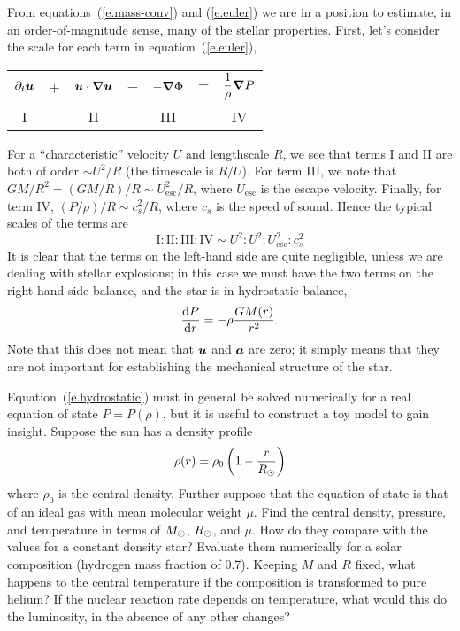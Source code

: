 From equations~(\ref{e.mass-conv}) and (\ref{e.euler}) we are in a position to estimate, in an order-of-magnitude sense, many of the stellar properties.  First, let's consider the scale for each term in equation~(\ref{e.euler}),
\begin{center}\begin{tabular}{ccccccc}
$\displaystyle \partial_{t}\boldsymbol{u}$ & + &
$\displaystyle  \boldsymbol{u}\cdot\boldsymbol{\nabla}\boldsymbol{u}$ & = &
$\displaystyle -\boldsymbol{\nabla} \Phi $ & $-$ & 
$\displaystyle \frac{1}{\rho}\boldsymbol{\nabla} P$\\
I & & II & & III & & IV
\end{tabular}
\end{center}
For a ``characteristic'' velocity $U$ and lengthscale $R$, we see that terms I and II are both of order $\sim U^{2}/R$ (the timescale is $R/U$).  For term III, we note that $GM/R^{2} = (GM/R)/R \sim U_{\mathrm{esc}}^{2}/R$, where $U_{\mathrm{esc}}$ is the escape velocity.  Finally, for term IV, $(P/\rho)/R \sim c_{s}^{2}/R$, where $c_{s}$ is the speed of sound.  Hence the typical scales of the terms are
\[
\textrm{I} : \textrm{II} : \textrm{III} : \textrm{IV} \sim U^{2} : U^{2} : U_{\mathrm{esc}}^{2} : c_{s}^{2}
\]
It is clear that the terms on the left-hand side are quite negligible, unless we are dealing with stellar explosions; in this case we must have the two terms on the right-hand side balance, and the star is in hydrostatic balance, 
\begin{equation}\label{e.hydrostatic}
\frac{\mathrm{d} P}{\mathrm{d} r} = -\rho \frac{GM(r)}{r^{2}}.
\end{equation}
Note that this does not mean that $\boldsymbol{u}$ and $\boldsymbol{a}$ are zero; it simply means that they are not important for establishing the mechanical structure of the star.

\begin{exercisebox}
Equation~(\ref{e.hydrostatic}) must in general be solved numerically for a real equation of state $P = P(\rho)$, but it is useful to construct a toy model to gain insight.  Suppose the sun has a density profile
\[ \rho(r) = \rho_{0}\left(1-\frac{r}{R_{\odot}}\right) \]
where $\rho_{0}$ is the central density. Further suppose that the equation of state is that of an ideal gas with mean molecular weight $\mu$.  Find the central density, pressure, and temperature in terms of $M_\odot$, $R_{\odot}$, and $\mu$. How do they compare with the values for a constant density star?  Evaluate them numerically for a solar composition (hydrogen mass fraction of 0.7).  Keeping $M$ and $R$ fixed, what happens to the central temperature if the composition is transformed to pure helium? If the nuclear reaction rate depends on temperature, what would this do the luminosity, in the absence of any other changes?
\end{exercisebox}

